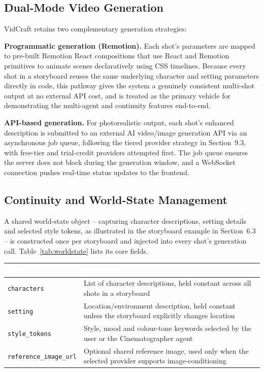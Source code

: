 \documentclass[11pt,a4paper]{article}
\newcommand{\tblhead}[1]{\cellcolor{headerblue}\textcolor{white}{\textbf{#1}}}
\begin{document}
\subsection{Dual-Mode Video Generation}

VidCraft retains two complementary generation strategies:

\textbf{Programmatic generation (Remotion).} Each shot's parameters are mapped to pre-built Remotion React compositions that use React and Remotion primitives to animate scenes declaratively using CSS timelines. Because every shot in a storyboard reuses the same underlying character and setting parameters directly in code, this pathway gives the system a genuinely consistent multi-shot output at no external API cost, and is treated as the primary vehicle for demonstrating the multi-agent and continuity features end-to-end.

\textbf{API-based generation.} For photorealistic output, each shot's enhanced description is submitted to an external AI video/image generation API via an asynchronous job queue, following the tiered provider strategy in Section~9.3, with free-tier and trial-credit providers attempted first. The job queue ensures the server does not block during the generation window, and a WebSocket connection pushes real-time status updates to the frontend.

\subsection{Continuity and World-State Management}

A shared world-state object -- capturing character descriptions, setting details and selected style tokens, as illustrated in the storyboard example in Section~6.3 -- is constructed once per storyboard and injected into every shot's generation call. Table~\ref{tab:worldstate} lists its core fields.

\begin{center}
\begin{tabular}{|p{3.5cm}|p{9.5cm}|}
\hline
\tblhead{Field} & \tblhead{Description} \\
\hline
\texttt{characters} & List of character descriptions, held constant across all shots in a storyboard \\
\hline
\texttt{setting} & Location/environment description, held constant unless the storyboard explicitly changes location \\
\hline
\texttt{style\_tokens} & Style, mood and colour-tone keywords selected by the user or the Cinematographer agent \\
\hline
\texttt{reference\_image\_url} & Optional shared reference image, used only when the selected provider supports image-conditioning \\
\hline
\end{tabular}
\label{tab:worldstate}
\end{center}
\end{document}
